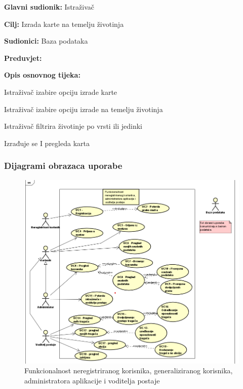 					\begin{packed_item}
	
						\item \textbf{Glavni sudionik: } Istraživač
						\item  \textbf{Cilj:} Izrada karte na temelju životinja
						\item  \textbf{Sudionici:} Baza podataka
						\item  \textbf{Preduvjet:}
						\item  \textbf{Opis osnovnog tijeka:}
						
						\item[] \begin{packed_enum}
	
							\item 	Istraživač izabire opciju izrade karte
							\item  Istraživač izabire opciju izrade na temelju životinja
							\item  Istraživač filtrira životinje po vrsti ili jedinki
							\item  Izrađuje se I pregleda karta
							
							
						\end{packed_enum}
					\end{packed_item}
					
					
					
				\subsubsection{Dijagrami obrazaca uporabe}
					
					\textit{}
				
					\begin{figure}[H]
						\includegraphics[scale=0.8]{slike/dijagram admin.png} %
						\centering
						\caption{Funkcionalnost neregistriranog korisnika, generaliziranog korisnika, administratora aplikacije i voditelja postaje}
						\label{fig:Funkcionalnost neregistriranog korisnika, administratora aplikacije i voditelja postaje}
					\end{figure}
					
